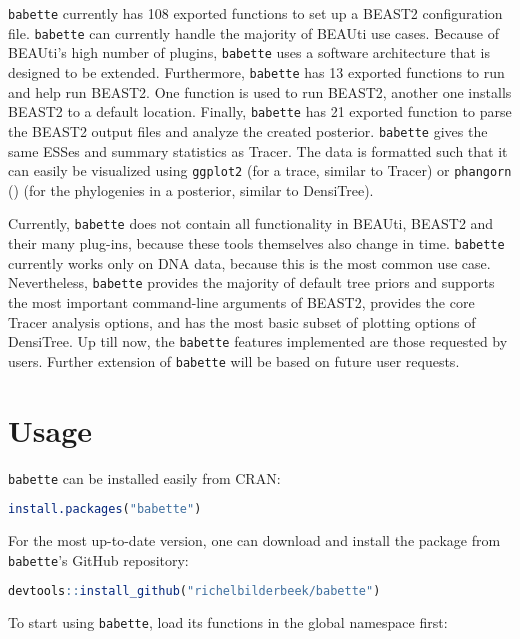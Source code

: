\documentclass{article}
\begin{document}
\verb;babette; currently has 108 exported functions to set up  
a BEAST2 configuration file. 
\verb;babette; can currently handle the majority of BEAUti use cases.
Because of BEAUti's high number of plugins, 
\verb;babette; uses a software architecture that is designed to be extended.
Furthermore, \verb;babette; has 13 exported functions to run and help run BEAST2.
One function is used to run BEAST2, another
one installs BEAST2 to a default location.
Finally, \verb;babette; has 21 exported function to parse the BEAST2 output
files and analyze the created posterior. \verb;babette; gives the
same ESSes and summary statistics as Tracer. The data is formatted
such that it can easily be visualized using \verb;ggplot2; (for a trace,
similar to Tracer) or \verb;phangorn; (\cite{phangorn}) (for 
the phylogenies in a posterior, similar to DensiTree). 

Currently, \verb;babette; does not contain all functionality 
in BEAUti, BEAST2 and their many plug-ins, 
because these tools themselves also change in time.
\verb;babette; currently works only on DNA data,
because this is the most common use case. 
Nevertheless, \verb;babette; provides the majority of default tree priors and supports the most important command-line arguments of BEAST2, provides
the core Tracer analysis options, and has the most basic subset of 
plotting options of DensiTree. Up till now, the \verb;babette; features 
implemented are those requested by users. Further extension of \verb;babette; 
will be based on future user requests.

\section{Usage}

\verb;babette; can be installed easily from CRAN:

\begin{lstlisting}[language=R, floatplacement=H]
install.packages("babette")
\end{lstlisting}
For the most up-to-date version, 
one can download and install the package from \verb;babette;'s GitHub repository:

\begin{lstlisting}[language=R, floatplacement=H]
devtools::install_github("richelbilderbeek/babette")
\end{lstlisting}
To start using \verb;babette;, load its functions in the global namespace first:
\end{document}
